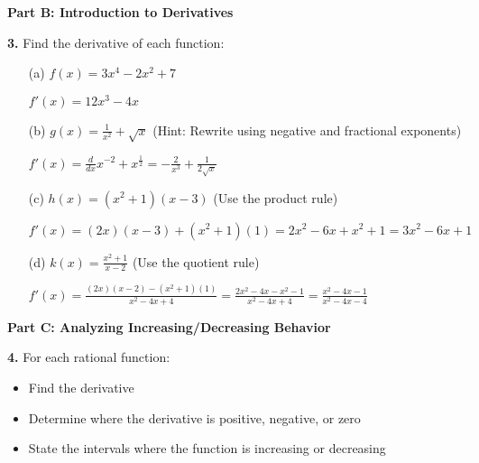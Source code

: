 \documentclass[12pt]{article}
\begin{document}
\textbf{Part B: Introduction to Derivatives}

\textbf{3.} Find the derivative of each function:

\begin{enumerate}
\item[(a)] $f(x) = 3x^4 - 2x^2 + 7$
\\[8pt]
\begin{minipage}[t][2cm][t]{\linewidth}
    $\displaystyle f'(x) = 12x^3-4x$
\end{minipage}

\item[(b)] $g(x) = \frac{1}{x^2} + \sqrt{x}$ (Hint: Rewrite using negative and fractional exponents)
\\[8pt]
\begin{minipage}[t][2cm][t]{\linewidth}
    $\displaystyle f'(x) = \frac{d}{dx} x^{-2} + x^{\frac{1}{2}} = -\frac{2}{x^{3}} + \frac{1}{2\sqrt{x}}$
\end{minipage}

\item[(c)] $h(x) = (x^2 + 1)(x - 3)$ (Use the product rule)
\\[8pt]
\begin{minipage}[t][3cm][t]{\linewidth}
    $\displaystyle f'(x) = (2x)(x-3) + (x^2+1)(1) = 2x^2-6x+x^2+1 = 3x^2-6x+1$
\end{minipage}

\item[(d)] $k(x) = \frac{x^2 + 1}{x - 2}$ (Use the quotient rule)
\\[8pt]
\begin{minipage}[t][3cm][t]{\linewidth}
    $\displaystyle f'(x) = \frac{(2x)(x-2) - (x^2+1)(1)}{x^2-4x+4} = \frac{2x^2-4x-x^2-1}{x^2-4x+4} = \frac{x^2-4x-1}{x^2-4x-4}$
\end{minipage}
\end{enumerate}

\textbf{Part C: Analyzing Increasing/Decreasing Behavior}

\textbf{4.} For each rational function:
\begin{itemize}
\item Find the derivative
\item Determine where the derivative is positive, negative, or zero
\item State the intervals where the function is increasing or decreasing
\end{itemize}
\end{document}

